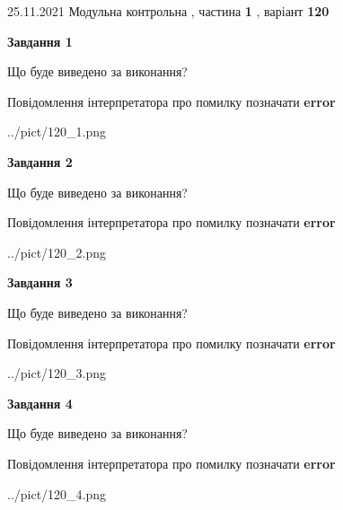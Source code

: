 \documentclass[10pt, ukrainian]{article}
\begin{document}
{25.11.2021 Модульна контрольна , частина \textbf { 1 }, варіант  \No \textbf { 120 }\par}
{
\begin {large}

{\begin {center}\textbf{Завдання 1}\end {center}}\par
Що буде виведено за виконання? \par
Повідомлення інтерпретатора про помилку позначати \textbf{error}

\begin{center}
	{../pict/120_1.png}
\end{center}
\newpage

{\begin {center}\textbf{Завдання 2}\end {center}}\par
Що буде виведено за виконання? \par
Повідомлення інтерпретатора про помилку позначати \textbf{error}

\begin{center}
	{../pict/120_2.png}
\end{center}
\newpage

{\begin {center}\textbf{Завдання 3}\end {center}}\par
Що буде виведено за виконання? \par
Повідомлення інтерпретатора про помилку позначати \textbf{error}

\begin{center}
	{../pict/120_3.png}
\end{center}
\newpage

{\begin {center}\textbf{Завдання 4}\end {center}}\par
Що буде виведено за виконання? \par
Повідомлення інтерпретатора про помилку позначати \textbf{error}

\begin{center}
	{../pict/120_4.png}
\end{center}
\newpage


\end{large}}
\end{document}
